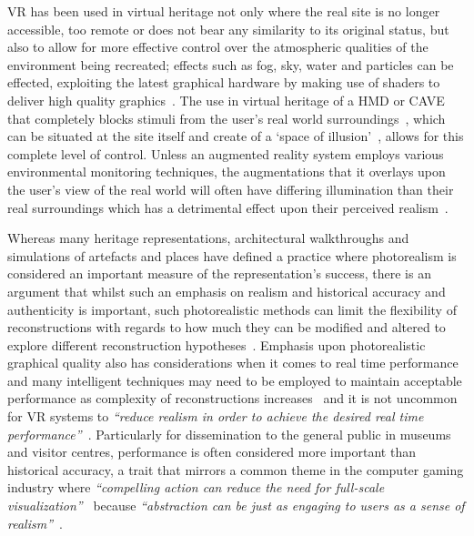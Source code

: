 VR has been used in virtual heritage not only where the real site is no longer accessible, too remote or does not bear any similarity to its original status, but also to allow for more effective control over the atmospheric qualities of the environment being recreated; effects such as fog, sky, water and particles can be effected, exploiting the latest graphical hardware by making use of shaders to deliver high quality graphics~\cite{deamicis:gamebased}. The use in virtual heritage of a HMD or CAVE that completely blocks stimuli from the user's real world surroundings~\cite{cabral:x3dexperience,Christou2006}, which can be situated at the site itself and create of a `space of illusion'~\cite{Tzortzaki2002}, allows for this complete level of control. Unless an augmented reality system employs various environmental monitoring techniques, the augmentations that it overlays upon the user's view of the real world will often have differing illumination than their real surroundings which has a detrimental effect upon their perceived realism~\cite{mcnamara:lightness}.

Whereas many heritage representations, architectural walkthroughs and simulations of artefacts and places have defined a practice where photorealism is considered an important measure of the representation's success, there is an argument that whilst such an emphasis on realism and historical accuracy and authenticity is important, such photorealistic methods can limit the flexibility of reconstructions with regards to how much they can be modified and altered to explore different reconstruction hypotheses~\cite{roussou:photorealism}. Emphasis upon photorealistic graphical quality also has considerations when it comes to real time performance and many intelligent techniques may need to be employed to maintain acceptable performance as complexity of reconstructions increases~\cite{willmott:largecomplex} and it is not uncommon for VR systems to \textit{``reduce realism in order to achieve the desired real time performance''}~\cite{Chalmers2014}. Particularly for dissemination to the general public in museums and visitor centres, performance is often considered more important than historical accuracy, a trait that mirrors a common theme in the computer gaming industry where \textit{``compelling action can reduce the need for full-scale visualization''}~\cite{Heim2014} because \textit{``abstraction can be just as engaging to users as a sense of realism''}~\cite{Champion2014}.


